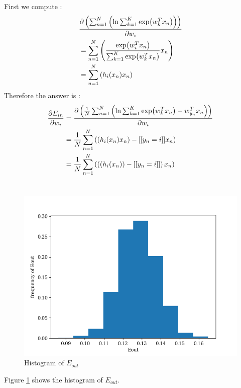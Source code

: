 \documentclass[12pt,a4paper]{article}
\begin{document}
\section{} %
First we compute :
\[
	\begin{aligned}
		& \pdv{\left(\sum_{n=1}^{N} \left( \ln\sum_{k=1}^{K}
			\exp({w}_{k}^{T} x_{n})\right)\right)}{w_{i}} \\
		&= \sum_{n=1}^{N} \left( \frac{\exp({w}_{i}^{T} x_{n})}
			{\sum_{k=1}^{K} \exp({w}_{k}^{T} x_{n})}x_{n} \right) \\
		&= \sum_{n=1}^{N} \left( h_{i}(x_{n}) x_{n} \right) \\
	\end{aligned}
\]
Therefore the answer is :
\[
	\begin{aligned}
		\pdv{E_{in}}{w_{i}}
			&= \pdv{\left(\frac{1}{N} \sum_{n=1}^{N} \left( \ln \sum_{k=1}^{K} \exp({w}_{k}^{T}x_{n}) -
			{w}_{y_{n}}^{T}x_{n} \right) \right)}{w_{i}} \\
		&= \frac{1}{N} \sum_{n=1}^{N} \left( \left( h_{i}(x_{n}) x_{n} \right) -
			[[y_{n}=i]] x_{n} \right) \\
		&= \frac{1}{N} \sum_{n=1}^{N} \left( \left( \left( h_{i}(x_{n}) \right) -
			[[y_{n}=i]] \right) x_{n} \right) \\
	\end{aligned}
\]
\section{} %
\begin{figure}[h!]
	\centering
	\includegraphics[width=0.8\linewidth]{code/q7.png}
	\caption{Histogram of ${E}_{out}$}
	\label{fig:q7}
\end{figure}
Figure \ref{fig:q7} shows the histogram of ${E}_{out}$.
\end{document}
